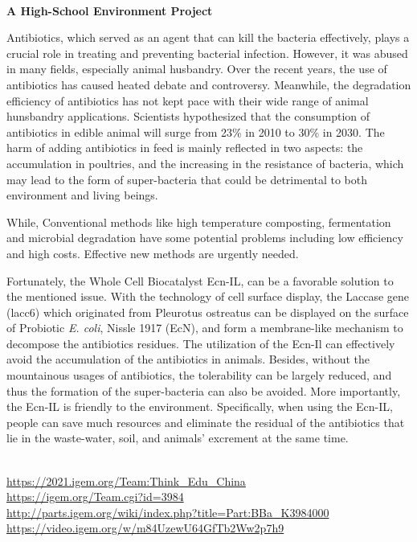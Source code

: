 \textbf{\\A High-School Environment Project\\}\begin{spacing}{1.5}

Antibiotics, which served as an agent that can kill the bacteria effectively, plays a crucial role in treating and preventing bacterial infection. However, it was abused in many fields, especially animal husbandry. Over the recent years, the use of antibiotics has caused heated debate and controversy. Meanwhile, the degradation efficiency of antibiotics has not kept pace with their wide range of animal hunsbandry applications. Scientists hypothesized that the consumption of antibiotics in edible animal will surge from 23\% in 2010 to 30\% in 2030. The harm of adding antibiotics in feed is mainly reflected in two aspects: the accumulation in poultries, and the increasing in the resistance of bacteria, which may lead to the form of super-bacteria that could be detrimental to both environment and living beings.

While, Conventional methods like high temperature composting, fermentation and microbial degradation have some potential problems including low efficiency and high costs. Effective new methods are urgently needed.

Fortunately, the Whole Cell Biocatalyst Ecn-IL, can be a favorable solution to the mentioned issue. With the technology of cell surface display, the Laccase gene (lacc6) which originated from Pleurotus ostreatus can be displayed on the surface of Probiotic \textit{E. coli}, Nissle 1917 (EcN), and form a membrane-like mechanism to decompose the antibiotics residues. The utilization of the Ecn-Il can effectively avoid the accumulation of the antibiotics in animals. Besides, without the mountainous usages of antibiotics, the tolerability can be largely reduced, and thus the formation of the super-bacteria can also be avoided. More importantly, the Ecn-IL is friendly to the environment. Specifically, when using the Ecn-IL, people can save much resources and eliminate the residual of the antibiotics that lie in the waste-water, soil, and animals’ excrement at the same time.\end{spacing}
\\

\url{https://2021.igem.org/Team:Think\_Edu_China }\\
\url{https://igem.org/Team.cgi?id=3984 }\\
\url{http://parts.igem.org/wiki/index.php?title=Part:BBa_K3984000 }\\
\url{https://video.igem.org/w/m84UzewU64GfTb2Ww2p7h9 }\\

